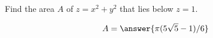 \documentclass{ximera}
\author{David Guichard \and Neal Koblitz \and H. Jerome Keisler \and Albert Scheller \and Barry Balof \and Mike Wills \and Matthew Carr}
\begin{document}
\begin{exercise}




Find the area $A$ of $z=x^2+y^2$ that lies below $z=1$.
 
\begin{prompt}
\[
A=\answer{\pi(5\sqrt{5}-1)/6}
\]
\end{prompt}


\end{exercise}
\end{document}
